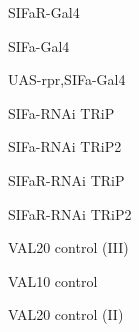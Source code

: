 \documentclass[17pt]{extarticle}
\begin{document}
\begin{large}
SIFaR-Gal4 \\[0.5em]
\end{large}
\footnotesize
\newpage\vspace*{-0.15cm}
\begin{large}
SIFa-Gal4 \\[0.5em]
\end{large}
\footnotesize
\newpage\vspace*{-0.15cm}
\begin{footnotesize}
UAS-rpr,SIFa-Gal4 \\[0.5em]
\end{footnotesize}
\footnotesize
\newpage\vspace*{-0.15cm}
\begin{normalsize}
SIFa-RNAi TRiP \\[0.5em]
\end{normalsize}
\footnotesize
\newpage\vspace*{-0.15cm}
\begin{normalsize}
SIFa-RNAi TRiP2 \\[0.5em]
\end{normalsize}
\footnotesize
\newpage\vspace*{-0.15cm}
\begin{normalsize}
SIFaR-RNAi TRiP \\[0.5em]
\end{normalsize}
\footnotesize
\newpage\vspace*{-0.15cm}
\begin{footnotesize}
SIFaR-RNAi TRiP2 \\[0.5em]
\end{footnotesize}
\footnotesize
\newpage\vspace*{-0.15cm}
\begin{footnotesize}
VAL20 control (III) \\[0.5em]
\end{footnotesize}
\footnotesize
\newpage\vspace*{-0.15cm}
\begin{normalsize}
VAL10 control \\[0.5em]
\end{normalsize}
\footnotesize
\newpage\vspace*{-0.15cm}
\begin{footnotesize}
VAL20 control (II) \\[0.5em]
\end{footnotesize}
\footnotesize
\newpage\vspace*{-0.15cm}
\end{document}
